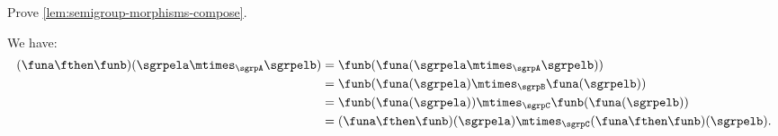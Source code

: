 \begin{exercise}
    Prove \cref{lem:semigroup-morphisms-compose}.
\end{exercise}
\begin{solution}
    We have:
    \begin{equation}
        \begin{aligned}
        (\funa \fthen \funb)(\sgrpela \mtimes_{\sgrpA} \sgrpelb)
            &=\funb(\funa(\sgrpela \mtimes_{\sgrpA} \sgrpelb))\\
            &=\funb(\funa(\sgrpela)\mtimes_{\sgrpB}\funa(\sgrpelb))\\
            &=\funb(\funa(\sgrpela))\mtimes_{\sgrpC} \funb(\funa(\sgrpelb))\\
            &=(\funa \fthen \funb)(\sgrpela) \mtimes_{\sgrpC} (\funa \fthen \funb)(\sgrpelb).
        \end{aligned}
    \end{equation}
\end{solution}
\showslides{
    \begin{forslides}
        \begin{equation}
            \label{eq:sgrp-posreals-mult}
            \tup{\posReals, \cdot}
        \end{equation}
        \begin{equation}
            \label{eq:sgrp-reals-plus}
            \tup{\reals, +}
        \end{equation}
    \end{forslides}
}%
